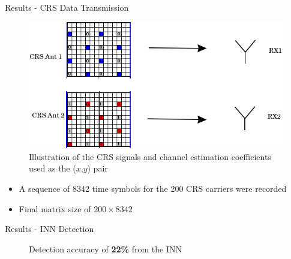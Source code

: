 \documentclass[10pt,t]{beamer}
\begin{document}
\begin{frame}{Results - CRS Data Transmission}
    \begin{figure}[!htb]
        \centering
        \includegraphics[width=0.8\linewidth]{../images/MultiAntennaCRSXYPairEdited.png}
        \caption{Illustration of the CRS signals and channel estimation coefficients used as the ($x$,$y$) pair}
    \end{figure}
    \begin{itemize}
        \item A sequence of 8342 time symbols for the 200 CRS carriers were recorded
        \item Final matrix size of $200\times8342$
    \end{itemize}
\end{frame}

\begin{frame}{Results - INN Detection}

    \begin{figure}%
        \centering
        \qquad
        \caption{Detection accuracy of \textbf{22\%} from the INN}
    \end{figure}
\end{frame}
\end{document}
